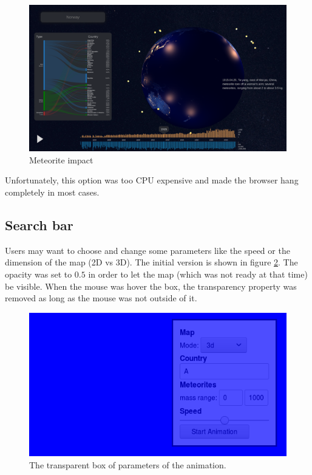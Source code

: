 \documentclass[10pt,conference,compsocconf]{IEEEtran}
\begin{document}
\begin{figure}[H]
  \centering
  \includegraphics[width=\columnwidth]{images/screenshot-meteorites-with-lights}
  \vspace{-3mm}
  \caption{Meteorite impact}
  \label{fig:meteorite_ligths}
\end{figure}

Unfortunately, this option was too CPU expensive and made the browser hang completely in most cases. 

\subsection{Search bar}

Users may want to choose and change some parameters like the speed or the dimension of the map (2D vs 3D). The initial version is shown in figure \ref{fig:box_tool}. The opacity was set to $0.5$ in order to let the map (which was not ready at that time) be visible. When the mouse was hover the box, the transparency property was removed as long as the mouse was not outside of it.

\begin{figure}[H]
  \centering
  \includegraphics[width=\columnwidth]{images/animation_box_tool.png}
  \vspace{-3mm}
  \caption{The transparent box of parameters of the animation.}
  \label{fig:box_tool}
\end{figure}
\end{document}
